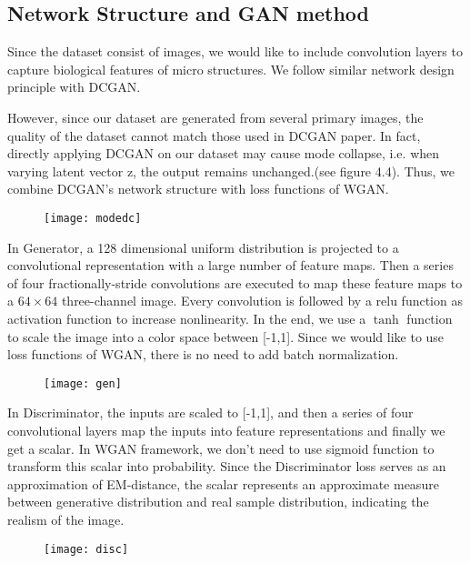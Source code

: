 \subsection{Network Structure and GAN method}
Since the dataset consist of images, we would like to include convolution layers to capture biological features of micro structures. We follow similar network design principle with DCGAN.

However, since our dataset are generated from several primary images, the quality of the dataset cannot match those used in DCGAN paper. In fact, directly applying DCGAN on our dataset may cause mode collapse, i.e. when varying latent vector z, the output remains unchanged.(see figure 4.4). Thus, we combine DCGAN's network structure with loss functions of WGAN.
\begin{figure}
	\centering
	\texttt{[image: modedc]}
	\label{fig:13}
\end{figure}
In Generator, a 128 dimensional uniform distribution is projected to a convolutional representation with a large number of feature maps. Then a series of four fractionally-stride convolutions are executed to map these feature maps to a $64\times64$ three-channel image. Every convolution is followed by a relu function as activation function to increase nonlinearity. In the end, we use a $\tanh$ function to scale the image into a color space between [-1,1]. Since we would like to use loss functions of WGAN, there is no need to add batch normalization.
\begin{figure}
	\centering
	\texttt{[image: gen]}
	\label{fig:14}
\end{figure}

In Discriminator, the inputs are scaled to [-1,1], and then a series of four convolutional layers map the inputs into feature representations and finally we get a scalar. In WGAN framework, we don't need to use sigmoid function to transform this scalar into probability. Since the Discriminator loss serves as an approximation of EM-distance, the scalar represents an approximate measure between generative distribution and real sample distribution, indicating the realism of the image.

\begin{figure}
	\centering
	\texttt{[image: disc]}
	\label{fig:14}
\end{figure}


